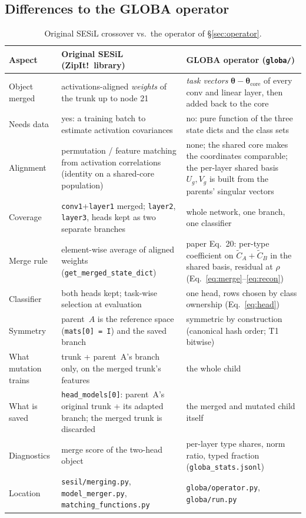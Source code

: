 \documentclass[11pt,a4paper]{article}
\newcommand{\thetav}{\boldsymbol{\theta}}
\newcommand{\Ug}{U_g}
\newcommand{\Vg}{V_g}
\newcommand{\Ct}{\tilde{C}}
\newcommand{\code}[1]{\texttt{#1}}
\begin{document}
\subsection{Differences to the GLOBA operator}
\begin{table}[h]
\centering\small
\caption{Original SESiL crossover vs.\ the operator of \S\ref{sec:operator}.}
\label{tab:diff}
\begin{tabular}{p{3.4cm}p{5.6cm}p{5.6cm}}
\toprule
Aspect & Original SESiL (ZipIt!\ library) & GLOBA operator (\code{globa/}) \\
\midrule
Object merged & activations-aligned \emph{weights} of the trunk up to node 21 & \emph{task vectors} $\thetav-\thetav_{\mathrm{core}}$ of every conv and linear layer, then added back to the core \\
Needs data & yes: a training batch to estimate activation covariances & no: pure function of the three state dicts and the class sets \\
Alignment & permutation / feature matching from activation correlations (identity on a shared-core population) & none; the shared core makes the coordinates comparable; the per-layer shared basis $\Ug,\Vg$ is built from the parents' singular vectors \\
Coverage & \code{conv1}+\code{layer1} merged; \code{layer2}, \code{layer3}, heads kept as two separate branches & whole network, one branch, one classifier \\
Merge rule & element-wise average of aligned weights (\code{get\_merged\_state\_dict}) & paper Eq.~20: per-type coefficient on $\Ct_A+\Ct_B$ in the shared basis, residual at $\rho$ (Eq.~\ref{eq:merge}--\ref{eq:recon}) \\
Classifier & both heads kept; task-wise selection at evaluation & one head, rows chosen by class ownership (Eq.~\ref{eq:head}) \\
Symmetry & parent~$A$ is the reference space (\code{mats[0] = I}) and the saved branch & symmetric by construction (canonical hash order; T1 bitwise) \\
What mutation trains & trunk + parent~A's branch only, on the merged trunk's features & the whole child \\
What is saved & \code{head\_models[0]}: parent~A's original trunk + its adapted branch; the merged trunk is discarded & the merged and mutated child itself \\
Diagnostics & merge score of the two-head object & per-layer type shares, norm ratio, typed fraction (\code{globa\_stats.jsonl}) \\
Location & \code{sesil/merging.py}, \code{model\_merger.py}, \code{matching\_functions.py} & \code{globa/operator.py}, \code{globa/run.py} \\
\bottomrule
\end{tabular}
\end{table}
\end{document}
